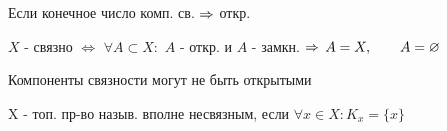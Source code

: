 \documentclass[geometry.tex]{subfiles}
\begin{document}
  \begin{upr}
      Если конечное число комп. св. $\Rightarrow$ откр.
  \end{upr}

  \begin{upr}
      $X$ - связно  $\Leftrightarrow$ $\forall A \subset X: $ $A$ - откр. и $A$ - замкн. $\Rightarrow$ $A = X, \qquad A = \varnothing$
  \end{upr}

  \begin{consequence}
        \item Компоненты связности могут не быть открытыми
  \end{consequence}

  \begin{ddefinition}
      X - топ. пр-во назыв. вполне несвязным, если $\forall x \in X: K_x = \{x\}$
  \end{ddefinition}
\end{document}
